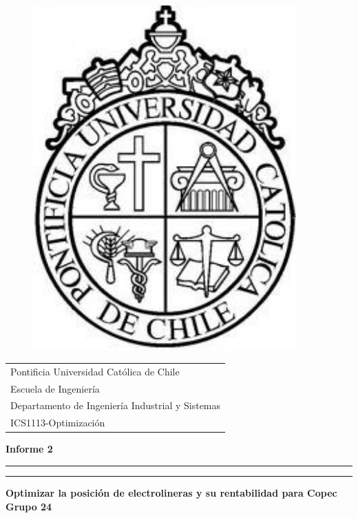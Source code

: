 \documentclass[letterpaper]{article}
\begin{document}
\begin{minipage}[t]{.13\textwidth}
	\vspace{-0.25in}
	\begin{figure}[H]
		\includegraphics[width=0.90\textwidth]{LogoUC.jpg}
	\end{figure}
\end{minipage}
\hfill
\begin{minipage}[t]{.85\textwidth}
	\vspace{0pt}
	\begin{flushleft}
		\begin{tabular}{l}
			{\sc Pontificia Universidad Cat\'olica de Chile}         \\
			{\sc Escuela de Ingenier\'ia}                            \\
			{\sc Departamento de Ingenier\'ia Industrial y Sistemas} \\
			{\sc ICS1113-Optimizaci\'on}
		\end{tabular}
	\end{flushleft}
\end{minipage}
\vspace{0pt}
\hfill
\vspace*{6cm}
\begin{center}{}
	\vspace*{2mm}
	{\Huge\bf Informe 2}\\
	\vspace*{4mm}
	\hrule\vspace*{1pt}\hrule
	\vspace*{4mm}
	{\LARGE\bf Optimizar la posici\'on de electrolineras y su rentabilidad para Copec}\\
	\vspace*{4mm}
	{\huge\bf Grupo 24 }\\
	\vspace*{1mm}
\end{center}
\end{document}

